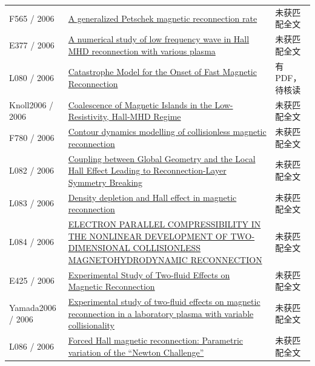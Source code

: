 \documentclass[UTF8,a4paper,11pt,openany,fontset=fandol]{ctexbook}
\begin{document}
\begin{longtable}{P{24mm}P{97mm}P{27mm}}
F565 / 2006 & \href{https://doi.org/10.1063/1.2375039}{A generalized Petschek magnetic reconnection rate} & 未获匹配全文\\

E377 / 2006 & \href{https://ui.adsabs.harvard.edu/abs/2006cosp...36.3552L/abstract}{A numerical study of low frequency wave in Hall MHD reconnection with various plasma} & 未获匹配全文\\

L080 / 2006 & \href{http://hdl.handle.net/1903/4139}{Catastrophe Model for the Onset of Fast Magnetic Reconnection} & 有PDF，待核读\\

Knoll2006 / 2006 & \href{https://doi.org/10.1103/physrevlett.96.135001}{Coalescence of Magnetic Islands in the Low-Resistivity,  Hall-MHD Regime} & 未获匹配全文\\

F780 / 2006 & \href{http://library.tue.nl/csp/dare/LinkToRepository.csp?recordnumber=686527}{Contour dynamics modelling of collisionless magnetic reconnection} & 未获匹配全文\\

L082 / 2006 & \href{https://doi.org/10.1103/physrevlett.97.135002}{Coupling between Global Geometry and the Local Hall Effect Leading to Reconnection-Layer Symmetry Breaking} & 未获匹配全文\\

L083 / 2006 & \href{https://doi.org/10.1029/2005ja011536}{Density depletion and Hall effect in magnetic reconnection} & 未获匹配全文\\

L084 / 2006 & \href{https://doi.org/10.1142/s0217984906011621}{ELECTRON PARALLEL COMPRESSIBILITY IN THE NONLINEAR DEVELOPMENT OF TWO-DIMENSIONAL COLLISIONLESS MAGNETOHYDRODYNAMIC RECONNECTION} & 未获匹配全文\\

E425 / 2006 & \href{http://absimage.aps.org/image/DPP06/MWS_DPP06-2006-000627.pdf}{Experimental Study of Two-fluid Effects on Magnetic Reconnection} & 未获匹配全文\\

Yamada2006 / 2006 & \href{https://doi.org/10.1063/1.2203950}{Experimental study of two-fluid effects on magnetic reconnection in a laboratory plasma with variable collisionality} & 未获匹配全文\\

L086 / 2006 & \href{https://doi.org/10.1063/1.2212397}{Forced Hall magnetic reconnection: Parametric variation of the “Newton Challenge”} & 未获匹配全文\\


\end{longtable}
\end{document}
